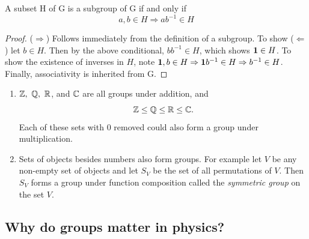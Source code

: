 \begin{proposition}{}{}
  A subset H of G is a subgroup of G if and only if
  $$a,b\in H\Rightarrow ab^{-1}\in H$$
  \begin{proof}
    ($\Rightarrow$) Follows immediately from the definition of a subgroup. To 
    show ($\Leftarrow$) let $b\in H$. Then by the above conditional, $bb^{-1}
    \in H$, which shows ${\mathbf 1}\in H$. To show the existence of inverses in $H$, 
    note ${\mathbf 1},b\in H\Rightarrow {\mathbf 1} b^{-1}\in H\Rightarrow b^{-1}\in H$. 
    Finally, associativity is inherited from G.
  \end{proof}
\end{proposition}

\begin{example*}{}{}
\begin{enumerate}
  \item $\mathbb{Z},\ \mathbb{Q},\ \mathbb{R}$, and $\mathbb{C}$ are all groups
        under addition, and
        $$ 
          \mathbb{Z} \leq \mathbb{Q} \leq \mathbb{R} \leq \mathbb{C}.
        $$ 
        Each of these sets with 0 removed could also form a group under
        multiplication.
  \item Sets of objects besides numbers also form groups. For example let $V$ 
        be any non-empty set of objects and let $S_{V}$ be the set of all
        permutations of $V$. Then $S_{V}$ forms a group under function
        composition called the {\it symmetric group} 
        on the set $V$.
\end{enumerate}
\end{example*}

\subsection{Why do groups matter in physics?}\label{sec:groupsMatter}


